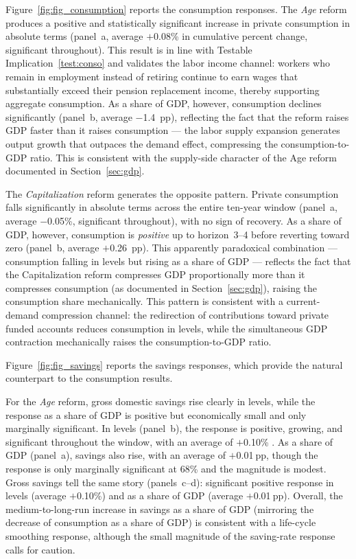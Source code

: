 \documentclass[11pt,english,a4paper, twoside, authoryear]{article}
\begin{document}
Figure~\ref{fig:fig_consumption} reports the consumption responses. The \textit{Age} reform produces a positive and statistically significant increase in private consumption in absolute terms (panel~a, average $+$0.08\% in cumulative percent change, significant throughout). This result is in line with Testable Implication~\ref{test:conso} and validates the labor income channel: workers who remain in employment instead of retiring continue to earn wages that substantially exceed their pension replacement income, thereby supporting aggregate consumption. As a share of GDP, however, consumption declines significantly (panel~b, average $-$1.4~pp), reflecting the fact that the reform raises GDP faster than it raises consumption --- the labor supply expansion generates output growth that outpaces the demand effect, compressing the consumption-to-GDP ratio. This is consistent with the supply-side character of the Age reform documented in Section~\ref{sec:gdp}.

The \textit{Capitalization} reform generates the opposite pattern. Private consumption falls significantly in absolute terms across the entire ten-year window (panel~a, average $-$0.05\%, significant throughout), with no sign of recovery. As a share of GDP, however, consumption is \emph{positive} up to horizon~3--4 before reverting toward zero (panel~b, average $+$0.26~pp). This apparently paradoxical combination --- consumption falling in levels but rising as a share of GDP --- reflects the fact that the Capitalization reform compresses GDP proportionally more than it compresses consumption (as documented in Section~\ref{sec:gdp}), raising the consumption share mechanically. This pattern is consistent with a current-demand compression channel: the redirection of contributions toward private funded accounts reduces consumption in levels, while the simultaneous GDP contraction mechanically raises the consumption-to-GDP ratio.

Figure~\ref{fig:fig_savings} reports the savings responses, which provide the natural counterpart to the consumption results.

For the \textit{Age} reform, gross domestic savings rise clearly in levels, while the response as a share of GDP is positive but economically small and only marginally significant. In levels (panel~b), the response is positive, growing, and significant throughout the window, with an average of $+$0.10\% . As a share of GDP (panel~a), savings also rise, with an average of $+$0.01$~$pp, though the response is only marginally significant at 68\% and the magnitude is modest. Gross savings tell the same story (panels~c--d): significant positive response in levels (average $+$0.10\%) and as a share of GDP (average $+$0.01$~$pp). Overall, the medium-to-long-run increase in savings as a share of GDP (mirroring the decrease of consumption as a share of GDP) is consistent with a life-cycle smoothing response, although the small magnitude of the saving-rate response calls for caution.
\end{document}
